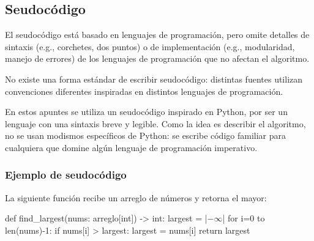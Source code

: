 \subsection{Seudocódigo}

El seudocódigo está basado en lenguajes de programación, pero omite detalles de sintaxis (e.g., corchetes, dos puntos) o de implementación (e.g., modularidad, manejo de errores) de los lenguajes de programación que no afectan el algoritmo.

No existe una forma estándar de escribir seudocódigo: distintas fuentes utilizan convenciones diferentes inspiradas en distintos lenguajes de programación.

En estos apuntes se utiliza un seudocódigo inspirado en Python, por ser un lenguaje con una sintaxis breve y legible. Como la idea es describir el algoritmo, no se usan modismos específicos de Python: se escribe código familiar para cualquiera que domine algún lenguaje de programación imperativo.

\subsubsection{Ejemplo de seudocódigo}

La siguiente función recibe un arreglo de números y retorna el mayor:
\begin{pseudocode}
def find_largest(nums: arreglo[int]) -> int:
    largest = |\(-\infty\)|
    for i=0 to len(nums)-1:
        if nums[i] > largest:
            largest = nums[i]
    return largest
\end{pseudocode}

